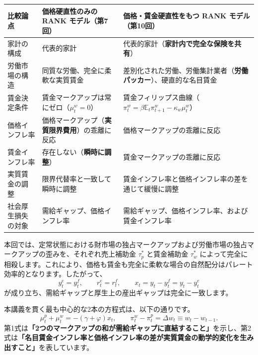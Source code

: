 \documentclass[
  japanese,
  lualatex,
  ja=standard,
  12pt,
  a4paper]{ltjsarticle}
\newcounter{none} %
\begin{document}
{\def\LTcaptype{none} %
\begin{longtable}[]{@{}
  >{\raggedright\arraybackslash}p{}
  >{\raggedright\arraybackslash}p{}
  >{\raggedright\arraybackslash}p{}@{}}
\toprule\noalign{}
\begin{minipage}[b]{\linewidth}\raggedright
比較論点
\end{minipage} & \begin{minipage}[b]{\linewidth}\raggedright
価格硬直性のみの RANK モデル（第7回）
\end{minipage} & \begin{minipage}[b]{\linewidth}\raggedright
価格・賃金硬直性をもつ RANK モデル（第10回）
\end{minipage} \\
\midrule\noalign{}
\endhead
\bottomrule\noalign{}
\endlastfoot
家計の構成 & 代表的家計 &
代表的家計（\textbf{家計内で完全な保険を共有}） \\
労働市場の構造 & 同質な労働、完全に柔軟な実質賃金 &
差別化された労働、労働集計業者（\textbf{労働パッカー}）、硬直的な名目賃金 \\
賃金決定条件 & 賃金マークアップは常にゼロ（\(\mu^w_t=0\)） &
賃金フィリップス曲線（\(\pi^w_t=\beta\mathbb{E}_t\pi^w_{t+1}-\kappa_w\mu^w_t\)） \\
価格インフレ率 & 価格マークアップ（\textbf{実質限界費用}）の乖離に反応 &
価格マークアップの乖離に反応 \\
賃金インフレ率 & 存在しない（\textbf{瞬時に調整}） &
賃金マークアップの乖離に反応 \\
実質賃金の調整 & 限界代替率と一致して瞬時に調整 &
賃金インフレ率と価格インフレ率の差を通じて緩慢に調整 \\
社会厚生損失の対象 & 需給ギャップ、価格インフレ率 &
需給ギャップ、価格インフレ率、および賃金インフレ率 \\
\end{longtable}
}

本回では、定常状態における財市場の独占マークアップおよび労働市場の独占マークアップの歪みを、それぞれ売上補助金
\(\tau_p^*\) と賃金補助金 \(\tau_w^*\)
によって完全に相殺します。これにより、価格も賃金も完全に柔軟な場合の自然配分はパレート効率的となります。したがって、
\[
y_t^e=y_t^f,
\qquad
r_t^e=r_t^f,
\qquad
x_t=y_t-y_t^f=y_t-y_t^e
\] が成り立ち、需給ギャップと厚生上の産出ギャップは完全に一致します。

本講義を貫く最も中心的な2本の方程式は、以下の通りです。 \[
\mu_t^p+\mu_t^w=-(\gamma+\varphi)x_t,
\qquad
\pi_t^w-\pi_t^p=\Delta w_t \equiv w_t - w_{t-1}.
\]
第1式は\textbf{「2つのマークアップの和が需給ギャップに直結すること」}を示し、第2式は\textbf{「名目賃金インフレ率と価格インフレ率の差が実質賃金の動学的変化を生み出すこと」}を表しています。
\end{document}
